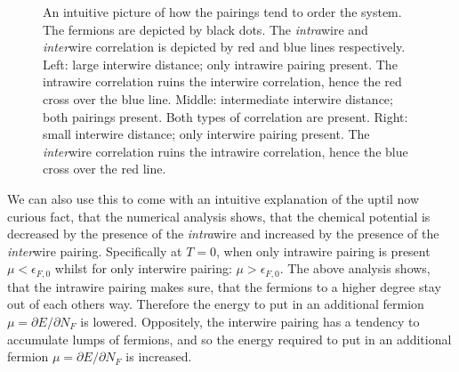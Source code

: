 \begin{figure}
\caption{An intuitive picture of how the pairings tend to order the system. The fermions are depicted by black dots. The \textit{intra}wire and \textit{inter}wire correlation is depicted by red and blue lines respectively. Left: large interwire distance; only intrawire pairing present. The intrawire correlation ruins the interwire correlation, hence the red cross over the blue line. Middle: intermediate interwire distance; both pairings present. Both types of correlation are present. Right: small interwire distance; only interwire pairing present. The \textit{inter}wire correlation ruins the intrawire correlation, hence the blue cross over the red line.}
\label{fig.2wirespositioncorrelations}
\end{figure}


We can also use this to come with an intuitive explanation of the uptil now curious fact, that the numerical analysis shows, that the chemical potential is decreased by the presence of the \textit{intra}wire and increased by the presence of the \textit{inter}wire pairing. Specifically at $T = 0$, when only intrawire pairing is present $\mu < \epsilon_{F,0}$ whilst for only interwire pairing: $\mu > \epsilon_{F,0}$. The above analysis shows, that the intrawire pairing makes sure, that the fermions to a higher degree stay out of each others way. Therefore the energy to put in an additional fermion $\mu = \partial E/\partial N_F$ is lowered. Oppositely, the interwire pairing has a tendency to accumulate lumps of fermions, and so the energy required to put in an additional fermion $\mu = \partial E/\partial N_F$ is increased. 

